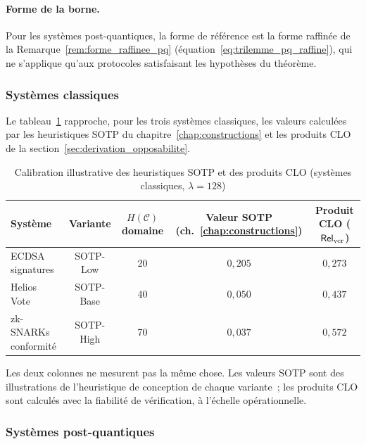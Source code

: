 \begin{sloppypar}
\paragraph{Forme de la borne.}
Pour les syst\`emes post-quantiques, la forme de r\'ef\'erence est la forme
raffin\'ee de la Remarque~\ref{rem:forme_raffinee_pq}
(\'equation~\eqref{eq:trilemme_pq_raffine}), qui ne s'applique qu'aux protocoles
satisfaisant les hypoth\`eses du th\'eor\`eme.

\label{eq:ecart_relatif}

\subsubsection{Syst\`emes classiques}
\label{subsubsec:resultats_classiques}

Le tableau~\ref{tab:coherence_classiques} rapproche, pour les trois syst\`emes
classiques, les valeurs calcul\'ees par les heuristiques SOTP du
chapitre~\ref{chap:constructions} et les produits CLO de la
section~\ref{sec:derivation_opposabilite}.

\begin{table}[htbp]
\centering
\caption{Calibration illustrative des heuristiques SOTP et des produits CLO
(syst\`emes classiques, $\lambda = 128$)}
\label{tab:coherence_classiques}
\small
\begin{tabular}{lcccc}
\toprule
\textbf{Syst\`eme} & \textbf{Variante} & \textbf{$H(\mathcal{C})$ domaine} &
\textbf{Valeur SOTP (ch.~\ref{chap:constructions})} & \textbf{Produit CLO ($\mathsf{Rel}_{\mathrm{ver}}$)} \\
\midrule
ECDSA signatures & SOTP-Low & 20 & $0{,}205$ & $0{,}273$ \\
Helios Vote & SOTP-Base & 40 & $0{,}050$ & $0{,}437$ \\
zk-SNARKs conformit\'e & SOTP-High & 70 & $0{,}037$ & $0{,}572$ \\
\bottomrule
\end{tabular}
\end{table}

Les deux colonnes ne mesurent pas la m\^eme chose. Les valeurs SOTP sont des
illustrations de l'heuristique de conception de chaque variante~; les produits
CLO sont calcul\'es avec la fiabilit\'e de v\'erification, \`a l'\'echelle
op\'erationnelle.

\subsubsection{Syst\`emes post-quantiques}
\label{subsubsec:resultats_postquantiques}


\end{sloppypar}
